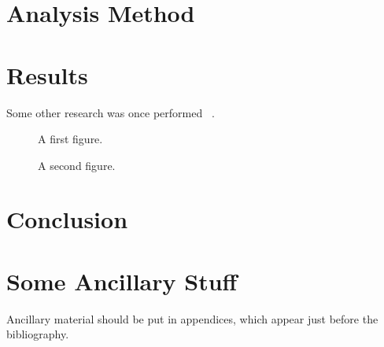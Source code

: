 \documentclass{gatech-thesis}
\begin{document}
\chapter{Analysis Method}

\chapter{Results}
Some other research was once performed ~\cite{Nobody06}.

\begin{figure}
\caption{A first figure.}
\end{figure}

\begin{figure}
\caption{A second figure.}
\end{figure}
\chapter{Conclusion}


\appendix
\chapter{Some Ancillary Stuff}

Ancillary material should be put in appendices, which 
appear just before the bibliography. 

\begin{postliminary}
{}

\begin{vita}

\end{vita}
\end{postliminary}
\end{document}
